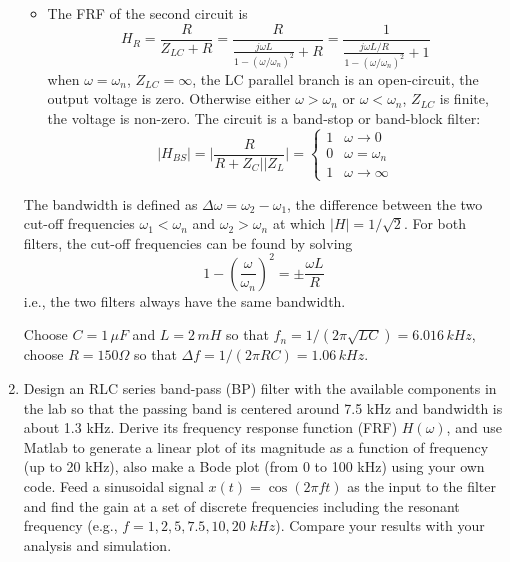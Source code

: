 \begin{enumerate}
\begin{itemize}
\item The FRF of the second circuit is
  \[
  H_R=\frac{R}{Z_{LC}+R}=\frac{R}{\frac{j\omega L}{1-(\omega/\omega_n)^2}+R}
  =\frac{1}{\frac{j\omega L/R}{1-(\omega/\omega_n)^2 }+1}
  \]
  when $\omega=\omega_n$, $Z_{LC}=\infty$, the LC parallel branch 
  is an open-circuit, the output voltage is zero. Otherwise either 
  $\omega>\omega_n$ or $\omega<\omega_n$, $Z_{LC}$ is finite, the
  voltage is non-zero. The circuit is a band-stop or band-block 
  filter:
  \[ 
  |H_{BS}|=\bigg|\frac{R}{R+Z_C||Z_L}\bigg|
  =\left\{\begin{array}{cc}1&\omega\rightarrow 0\\
  0&\omega=\omega_n\\ 1&\omega\rightarrow\infty\end{array}\right.
  \]

\end{itemize}
The bandwidth is defined as $\Delta\omega=\omega_2-\omega_1$, the
difference between the two cut-off frequencies $\omega_1<\omega_n$ 
and $\omega_2>\omega_n$ at which $|H|=1/\sqrt{2}$. For both filters,
the cut-off frequencies can be found by solving
\[
1-\left(\frac{\omega}{\omega_n}\right)^2 =\pm \frac{\omega L}{R}
\]
i.e., the two filters always have the same bandwidth.


  Choose $C=1\,\mu F$ and $L=2\,mH$ so that 
  $f_n=1/(2\pi\sqrt{LC})=6.016\,kHz$, choose $R=150\Omega$ so that
  $\Delta f=1/(2\pi RC)=1.06\,kHz$. 
  



\item Design an RLC series band-pass (BP) filter with the available components 
  in the lab so that the passing band is centered around 7.5 kHz and bandwidth
  is about 1.3 kHz. Derive its frequency response function (FRF) $H(\omega)$, 
  and use Matlab to generate a linear plot of its magnitude as a function of 
  frequency (up to 20 kHz), also make a Bode plot (from 0 to 100 kHz) using your
  own code. Feed 
  a sinusoidal signal $x(t)=\cos(2\pi ft)$ as the input to the filter and find the 
  gain at a set of discrete frequencies including the resonant frequency (e.g., $f=1, 
  2, 5, 7.5, 10, 20\; kHz$). Compare your results with your analysis and simulation.

  \begin{comment}
  {\bf Solution:} Use $C=0.1\,\mu F$, $L=4.7\,mH$ with internal resistance 
  $R_L=27\,\Omega$, and $R=10\,\Omega$, $\omega_n=1/\sqrt{LC}=4.6\times 10^4$,
  $Q=\omega_nL/(R+R_L)=5.86$, $\zeta=1/2Q=0.0853$, 
  $\Delta\,\omega=\omega_n/Q=7.87\times 10^3$, $f_n=\omega_n/2\pi=7.34\times 10^3$,
  $\Delta f=\Delta\omega/2\pi=7.34\;kHz$.
  \htmladdimg{../RLCfilterFig1.png}


\end{comment}
\end{enumerate}
